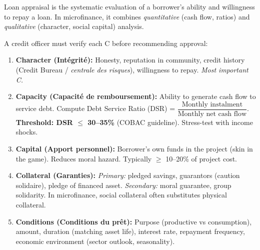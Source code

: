 \documentclass[11pt]{article}
\newcommand{\cle}[1]{{\popxbold\color{popdark}#1}}
\begin{document}
\begin{definition}
\cle{Loan appraisal} is the systematic evaluation of a borrower's ability and willingness to repay a loan. In microfinance, it combines \emph{quantitative} (cash flow, ratios) and \emph{qualitative} (character, social capital) analysis.
\end{definition}

\begin{methode}
A credit officer must verify each \cle{C} before recommending approval:
\begin{enumerate}
\item \textbf{Character (Intégrité):} Honesty, reputation in community, credit history (Credit Bureau / \emph{centrale des risques}), willingness to repay. \emph{Most important C.}
\item \textbf{Capacity (Capacité de remboursement):} Ability to generate cash flow to service debt. Compute \cle{Debt Service Ratio (DSR)} = $\dfrac{\text{Monthly instalment}}{\text{Monthly net cash flow}}$. \textbf{Threshold: DSR $\le$ 30--35\%} (COBAC guideline). Stress-test with income shocks.
\item \textbf{Capital (Apport personnel):} Borrower's own funds in the project (skin in the game). Reduces moral hazard. Typically $\ge$ 10--20\% of project cost.
\item \textbf{Collateral (Garanties):} \emph{Primary:} pledged savings, guarantors (caution solidaire), pledge of financed asset. \emph{Secondary:} moral guarantee, group solidarity. In microfinance, social collateral often substitutes physical collateral.
\item \textbf{Conditions (Conditions du prêt):} Purpose (productive vs consumption), amount, duration (matching asset life), interest rate, repayment frequency, economic environment (sector outlook, seasonality).
\end{enumerate}
\end{methode}
\end{document}

